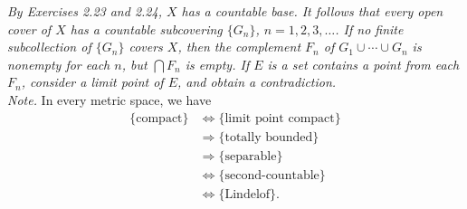 \documentclass{article}
\begin{document}
\emph{By Exercises 2.23 and 2.24, $X$ has a countable base.
It follows that every open cover of $X$ has a countable subcovering $\{G_n\}$,
$n = 1, 2, 3, \ldots$.
If no finite subcollection of $\{G_n\}$ covers $X$,
then the complement $F_n$ of $G_1 \cup \cdots \cup G_n$
is nonempty for each $n$, but $\bigcap F_n$ is empty.
If $E$ is a set contains a point from each $F_n$,
consider a limit point of $E$, and obtain a contradiction.} \\

\emph{Note.} In every metric space, we have
\begin{align*}
\{ \text{compact} \}
&\Longleftrightarrow
\{ \text{limit point compact} \} \\
&\Longrightarrow
\{ \text{totally bounded} \} \\
&\Longrightarrow
\{ \text{separable} \} \\
&\Longleftrightarrow
\{ \text{second-countable} \} \\
&\Longleftrightarrow
\{ \text{Lindelof} \}. \\
\end{align*}
\end{document}
